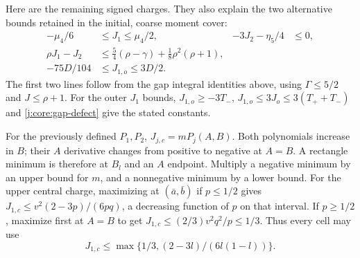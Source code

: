 Here are the remaining signed charges. They also explain the two
alternative bounds retained in the initial, coarse moment cover:
\begin{align}
 -\mu_4/6&\le J_1\le\mu_4/2,&
 -3J_2-\eta_5/4&\le0,                                  \label{j:local:mom:gap-signs}\\
 \rho J_1-J_2&\le\tfrac54(\rho-\gamma)+\tfrac18\rho^2(\rho+1),
                                                              \label{j:local:mom:oldgap}\\
 -75D/104&\le J_{1,o}\le3D/2.                           \label{j:local:mom:outer}
\end{align}
The first two lines follow from the gap integral identities above,
using $\Gamma\le5/2$ and $J\le\rho+1$. For the outer $J_1$ bounds,
$J_{1,o}\ge-3T_-$, $J_{1,o}\le3J_o\le3(T_++T_-)$ and
\eqref{j:core:gap-defect} give the stated constants.

For the previously defined $P_1,P_2$, $J_{j,c}=mP_j(A,B)$. Both polynomials increase in $B$; their $A$ derivative changes from positive to negative
at $A=B$. A rectangle minimum is therefore at $B_l$ and an $A$ endpoint.
Multiply a negative minimum by an upper bound for $m$, and a nonnegative
minimum by a lower bound. For the upper central charge, maximizing at
$(\bar a,\bar b)$ if $p\le1/2$ gives
$J_{1,c}\le v^2(2-3p)/(6pq)$, a decreasing function of $p$ on that interval.
If $p\ge1/2$, maximize first at $A=B$ to get
$J_{1,c}\le(2/3)v^2q^2/p\le1/3$. Thus every cell may use
\begin{equation}\label{j:local:mom:central-upper}
 J_{1,c}\le\max\{1/3,(2-3l)/(6l(1-l))\}.
\end{equation}

